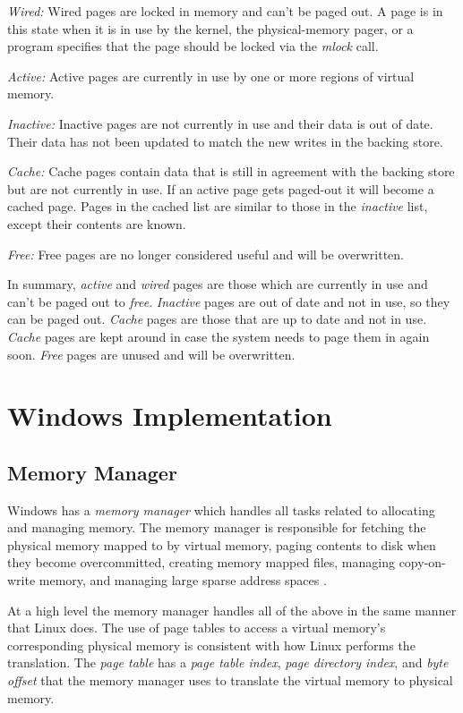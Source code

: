 \documentclass[onecolumn,draftclsnofoot, 10pt, compsoc]{IEEEtran}
\begin{document}
		\textit{Wired:} Wired pages are locked in memory and can't be paged out.
		A page is in this state when it is in use by the kernel, the physical-memory pager, or a program specifies that the page should be locked via the \textit{mlock} call.
		
		\textit{Active:} Active pages are currently in use by one or more regions of virtual memory.
		
		\textit{Inactive:} Inactive pages are not currently in use and their data is out of date.
		Their data has not been updated to match the new writes in the backing store.
		
		\textit{Cache:} Cache pages contain data that is still in agreement with the backing store but are not currently in use.
		If an active page gets paged-out it will become a cached page.
		Pages in the cached list are similar to those in the \textit{inactive} list, except their contents are known.
		
		\textit{Free:} Free pages are no longer considered useful and will be overwritten.
		
		In summary, \textit{active} and \textit{wired} pages are those which are currently in use and can't be paged out to \textit{free}. 
		\textit{Inactive} pages are out of date and not in use, so they can be paged out.
		\textit{Cache} pages are those that are up to date and not in use.
		\textit{Cache} pages are kept around in case the system needs to page them in again soon.
		\textit{Free} pages are unused and will be overwritten.
		
\section{Windows Implementation}
	\subsection{Memory Manager}	
		Windows has a \textit{memory manager} which handles all tasks related to allocating and managing memory. 
		The memory manager is responsible for fetching the physical memory mapped to by virtual memory, paging contents to disk when they become overcommitted, creating memory mapped files, managing copy-on-write memory, and managing large sparse address spaces \cite{windowsMM}.
		
		At a high level the memory manager handles all of the above in the same manner that Linux does.
		The use of page tables to access a virtual memory's corresponding physical memory is consistent with how Linux performs the translation.
		The \textit{page table} has a \textit{page table index}, \textit{page directory index}, and \textit{byte offset} that the memory manager uses to translate the virtual memory to physical memory.
		
\end{document}
